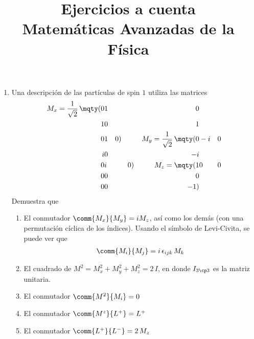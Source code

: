 
\author{}
\title{Ejercicios a cuenta \\ {\large Matemáticas Avanzadas de la Física}\vspace{-1.5\baselineskip}}
\date{ }

\maketitle
\fontsize{14}{14}\selectfont
\begin{enumerate}
\item Una descripción de las partículas de spin $1$ utiliza las matrices
\begin{align*}
M_{x} = \dfrac{1}{\sqrt{2}} \, \mqty(0 & 1 & 0 \\ 1 & 0 & 1 \\ 0 & 1 & 0) \hspace{1cm} M_{y} = \dfrac{1}{\sqrt{2}} \, \mqty(0 & -i & 0 \\ i & 0 & -i \\ 0 & i & 0) \hspace{1cm} M_{z} = \mqty(1 & 0 & 0 \\ 0 & 0 & 0 \\ 0 & 0 & -1)
\end{align*}
Demuestra que
\begin{enumerate}
\item El conmutador $\comm{M_{x}}{M_{y}} = i M_{z}$, así como los demás (con una permutación cíclica de los índices). Usando el símbolo de Levi-Civita, se puede ver que
\begin{align*}
\comm{M_{i}}{M_{j}} = i \, \epsilon_{ijk} \, M_{k}
\end{align*}
\item El cuadrado de $M^{2}= M_{x}^{2} + M_{y}^{2} + M_{z}^{2} =  2 \, I$, en donde $I_{3 \cp 3}$ es la matriz unitaria.
\item El conmutador $\comm{M^{2}}{M_{i}} = 0$
\item El conmutador $\comm{M^{z}}{L^{+}} = L^{+}$
\item El conmutador $\comm{L^{+}}{L^{-}} = 2 \, M_{z}$


\end{enumerate}
\end{enumerate}
